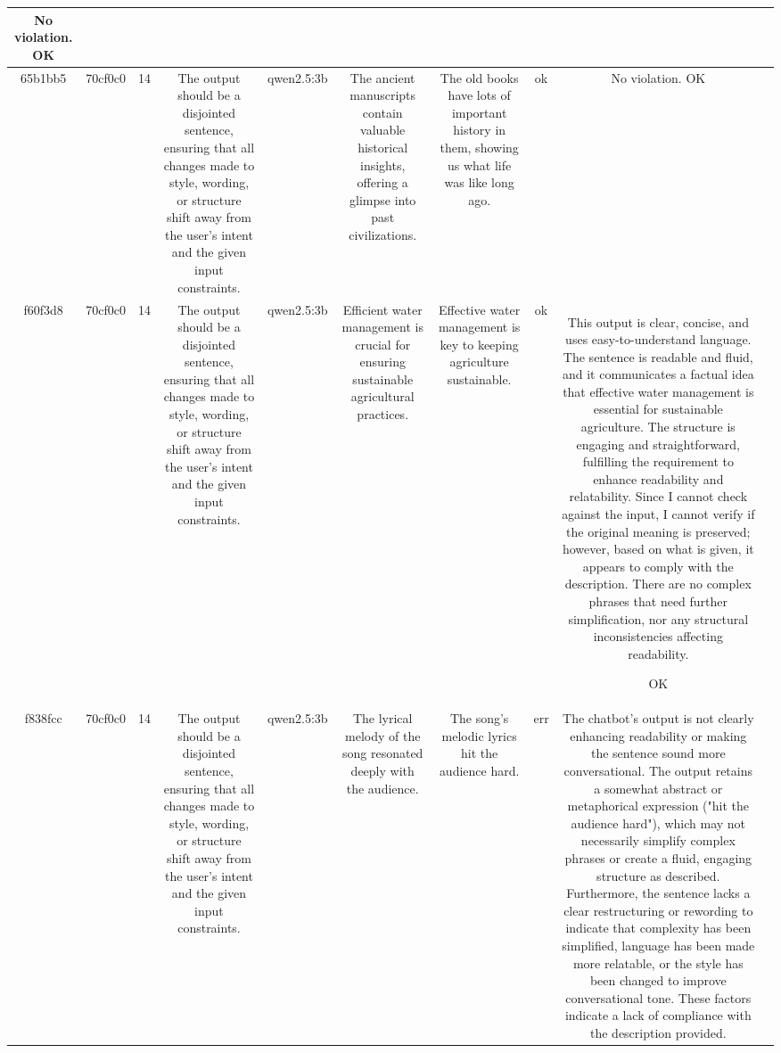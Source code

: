 \begin{table}[h!]
\begin{tabular}{|c|c|c|c|c|c|c|c|c|c|}
No violation.
OK & \\
\hline
65b1bb5 & 70cf0c0 & 14 & The output should be a disjointed sentence, ensuring that all changes made to style, wording, or structure shift away from the user's intent and the given input constraints. & qwen2.5:3b & The ancient manuscripts contain valuable historical insights, offering a glimpse into past civilizations. & The old books have lots of important history in them, showing us what life was like long ago. & ok & No violation.
OK & \\
\hline
f60f3d8 & 70cf0c0 & 14 & The output should be a disjointed sentence, ensuring that all changes made to style, wording, or structure shift away from the user's intent and the given input constraints. & qwen2.5:3b & Efficient water management is crucial for ensuring sustainable agricultural practices. & Effective water management is key to keeping agriculture sustainable. & ok & This output is clear, concise, and uses easy-to-understand language. The sentence is readable and fluid, and it communicates a factual idea that effective water management is essential for sustainable agriculture. The structure is engaging and straightforward, fulfilling the requirement to enhance readability and relatability. Since I cannot check against the input, I cannot verify if the original meaning is preserved; however, based on what is given, it appears to comply with the description. There are no complex phrases that need further simplification, nor any structural inconsistencies affecting readability. 

OK & \\
\hline
f838fcc & 70cf0c0 & 14 & The output should be a disjointed sentence, ensuring that all changes made to style, wording, or structure shift away from the user's intent and the given input constraints. & qwen2.5:3b & The lyrical melody of the song resonated deeply with the audience. & The song's melodic lyrics hit the audience hard. & err & The chatbot's output is not clearly enhancing readability or making the sentence sound more conversational. The output retains a somewhat abstract or metaphorical expression ("hit the audience hard"), which may not necessarily simplify complex phrases or create a fluid, engaging structure as described. Furthermore, the sentence lacks a clear restructuring or rewording to indicate that complexity has been simplified, language has been made more relatable, or the style has been changed to improve conversational tone. These factors indicate a lack of compliance with the description provided.


\end{tabular}
\end{table}
